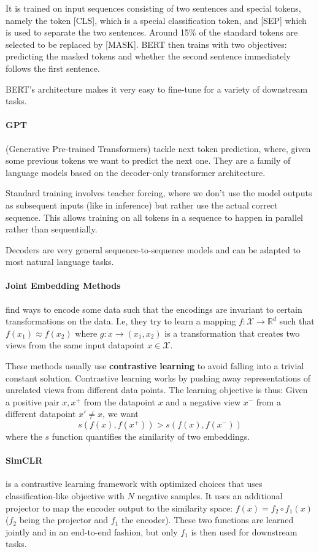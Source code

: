 \documentclass{article}
\newcommand{\R}{\mathbb{R}}
\begin{document}
It is trained on input sequences consisting of two sentences and special tokens, namely the token [CLS], which is a special classification token, and [SEP] which is used to separate the two sentences.
Around 15\% of the standard tokens are selected to be replaced by [MASK].
BERT then trains with two objectives: predicting the masked tokens and whether the second sentence immediately follows the first sentence.

BERT's architecture makes it very easy to fine-tune for a variety of downstream tasks.

\paragraph{GPT} (Generative Pre-trained Transformers) tackle next token prediction, where, given some previous tokens we want to predict the next one.
They are a family of language models based on the decoder-only transformer architecture.

Standard training involves teacher forcing, where we don’t use the model outputs as subsequent inputs (like in inference) but rather use the actual correct sequence.
This allows training on all tokens in a sequence to happen in parallel rather than sequentially.

Decoders are very general sequence-to-sequence models and can be adapted to most natural language tasks.

\paragraph{Joint Embedding Methods} find ways to encode some data such that the encodings are invariant to certain transformations on the data.
I.e, they try to learn a mapping $f: \mathcal{X} \to \R^d$ such that $f(x_1) \approx f(x_2)$ where $g : x \to (x_1, x_2)$ is a transformation that creates two views from the same input datapoint $x \in \mathcal{X}$.

These methods usually use \textbf{contrastive learning} to avoid falling into a trivial constant solution.
Contrastive learning works by pushing away representations of unrelated views from different data points.
The learning objective is thus:
Given a positive pair $x, x^+$ from the datapoint $x$ and a negative view $x^-$ from a different datapoint $x' \neq x$, we want
$$
s(f(x), f(x^+)) > s(f(x), f(x^-))
$$
where the $s$ function quantifies the similarity of two embeddings.

\paragraph{SimCLR} is a contrastive learning framework with optimized choices that uses classification-like objective with $N$ negative samples.
It uses an additional projector to map the encoder output to the similarity space: $f(x) = f_2 \circ f_1 (x)$ ($f_2$ being the projector and $f_1$ the encoder).
These two functions are learned jointly and in an end-to-end fashion, but only $f_1$ is then used for downstream tasks.
\end{document}
